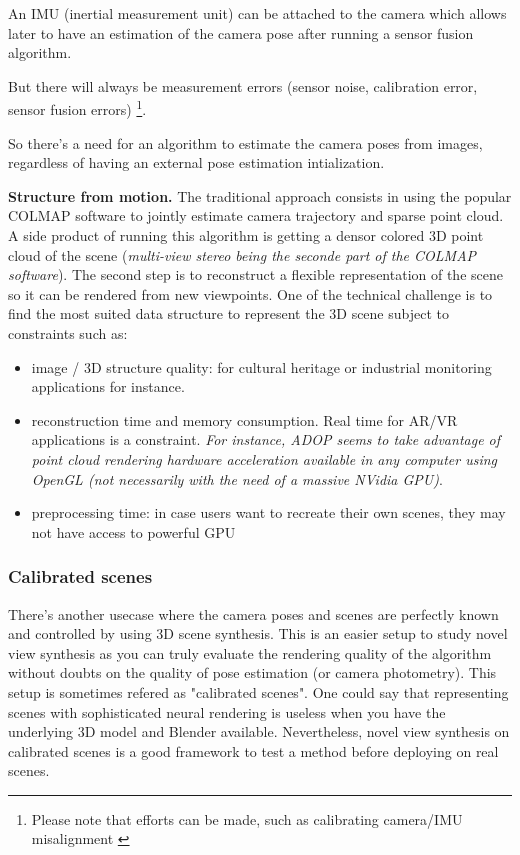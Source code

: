 \noindent An IMU (inertial measurement unit) can be attached to the camera which allows later to have an estimation of the camera pose after running a sensor fusion algorithm.

\noindent But there will always be measurement errors (sensor noise, calibration error, sensor fusion errors) \footnote{Please note that efforts can be made, such as calibrating camera/IMU misalignment \cite{karpenko2011gyrostab}}.

So there's a need for an algorithm to estimate the camera poses from images, regardless of having an external pose estimation intialization.

\noindent \textbf{Structure from motion.} The traditional approach consists in using the popular COLMAP software \cite{schoenberger2016sfm} to jointly estimate camera trajectory and sparse point cloud. A side product of running this algorithm is getting a densor colored 3D point cloud of the scene (\textit{multi-view stereo being the seconde part of the COLMAP software}). 
The second step is to reconstruct a flexible representation of the scene so it can be rendered from new viewpoints. One of the technical challenge is to find the most suited data structure to represent the 3D scene subject to constraints such as: 
\begin{itemize}
    \item image / 3D structure quality: for cultural heritage or industrial monitoring applications for instance. 
    \item reconstruction time and memory consumption. Real time for AR/VR applications is a constraint. \textit{For instance, ADOP seems to take advantage of point cloud rendering hardware acceleration available in any computer using OpenGL (not necessarily with the need of a massive NVidia GPU)}. 
    \item preprocessing time: in case users want to recreate their own scenes, they may not have access to powerful GPU 
\end{itemize}

\subsubsection*{Calibrated scenes}
\label{sec:calibrated_scenes}
There's another usecase where the camera poses and scenes are perfectly known and controlled by using 3D scene synthesis. This is an easier setup to study novel view synthesis as you can truly evaluate the rendering quality of the algorithm without doubts on the quality of pose estimation (or camera photometry). This setup is sometimes refered as "calibrated scenes". One could say that representing scenes with sophisticated neural rendering is useless when you have the underlying 3D model and Blender available. Nevertheless, novel view synthesis on calibrated scenes is a good framework to test a method before deploying on real scenes.

